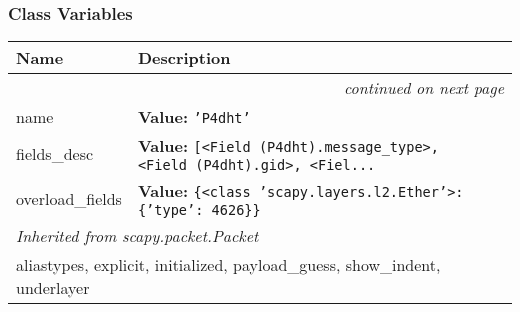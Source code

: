 
  \subsubsection{Class Variables}

    \vspace{-1cm}
\hspace{\varindent}\begin{longtable}{|p{\varnamewidth}|p{\vardescrwidth}|l}
\cline{1-2}
\cline{1-2} \centering \textbf{Name} & \centering \textbf{Description}& \\
\cline{1-2}
\endhead\cline{1-2}\multicolumn{3}{r}{\small\textit{continued on next page}}\\\endfoot\cline{1-2}
\endlastfoot\raggedright n\-a\-m\-e\- & \raggedright \textbf{Value:} 
{\tt \texttt{'}\texttt{P4dht}\texttt{'}}&\\
\cline{1-2}
\raggedright f\-i\-e\-l\-d\-s\-\_\-d\-e\-s\-c\- & \raggedright \textbf{Value:} 
{\tt \texttt{[}{\textless}Field (P4dht).message\_type{\textgreater}\texttt{, }{\textless}Field (P4dht).gid{\textgreater}\texttt{, }{\textless}Fiel\texttt{...}}&\\
\cline{1-2}
\raggedright o\-v\-e\-r\-l\-o\-a\-d\-\_\-f\-i\-e\-l\-d\-s\- & \raggedright \textbf{Value:} 
{\tt \texttt{\{}{\textless}class 'scapy.layers.l2.Ether'{\textgreater}\texttt{: }\texttt{\{}\texttt{'}\texttt{type}\texttt{'}\texttt{: }4626\texttt{\}}\texttt{\}}}&\\
\cline{1-2}
\multicolumn{2}{|l|}{\textit{Inherited from scapy.packet.Packet}}\\
\multicolumn{2}{|p{\varwidth}|}{\raggedright aliastypes, explicit, initialized, payload\_guess, show\_indent, underlayer}\\
\cline{1-2}
\end{longtable}

